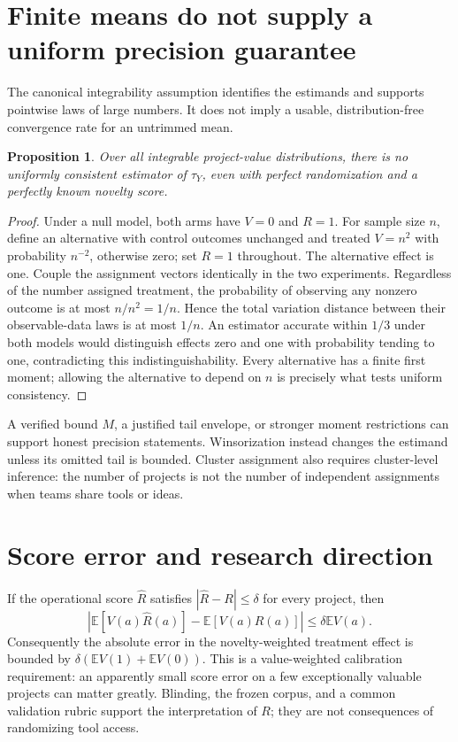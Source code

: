 \documentclass[11pt]{article}
\newtheorem{proposition}{Proposition}
\newcommand{\E}{\mathbb E}
\begin{document}
\section*{Finite means do not supply a uniform precision guarantee}
The canonical integrability assumption identifies the estimands and supports pointwise laws of large numbers. It does not imply a usable, distribution-free convergence rate for an untrimmed mean.
\begin{proposition}
Over all integrable project-value distributions, there is no uniformly consistent estimator of $\tau_Y$, even with perfect randomization and a perfectly known novelty score.
\end{proposition}
\begin{proof}
Under a null model, both arms have $V=0$ and $R=1$. For sample size $n$, define an alternative with control outcomes unchanged and treated $V=n^2$ with probability $n^{-2}$, otherwise zero; set $R=1$ throughout. The alternative effect is one. Couple the assignment vectors identically in the two experiments. Regardless of the number assigned treatment, the probability of observing any nonzero outcome is at most $n/n^2=1/n$. Hence the total variation distance between their observable-data laws is at most $1/n$. An estimator accurate within $1/3$ under both models would distinguish effects zero and one with probability tending to one, contradicting this indistinguishability. Every alternative has a finite first moment; allowing the alternative to depend on $n$ is precisely what tests uniform consistency.
\end{proof}
A verified bound $M$, a justified tail envelope, or stronger moment restrictions can support honest precision statements. Winsorization instead changes the estimand unless its omitted tail is bounded. Cluster assignment also requires cluster-level inference: the number of projects is not the number of independent assignments when teams share tools or ideas.

\section*{Score error and research direction}
If the operational score $\widehat R$ satisfies $|\widehat R-R|\leq\delta$ for every project, then
\[
 |\E[V(a)\widehat R(a)]-\E[V(a)R(a)]|\leq\delta\E V(a).
\]
Consequently the absolute error in the novelty-weighted treatment effect is bounded by $\delta(\E V(1)+\E V(0))$. This is a value-weighted calibration requirement: an apparently small score error on a few exceptionally valuable projects can matter greatly. Blinding, the frozen corpus, and a common validation rubric support the interpretation of $R$; they are not consequences of randomizing tool access.
\end{document}
